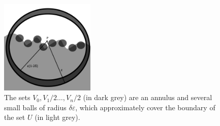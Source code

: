 \begin{figure}[ht]\label{covering diagram}
\caption{The sets $V_0, V_1/2 \dots, V_n/2$ (in dark grey) are an annulus and several small balls of radius $\delta \varepsilon$, which approximately cover the boundary of the set $U$ (in light grey).}
\includegraphics[width=0.4\textwidth]{covering lemma}
\end{figure}

